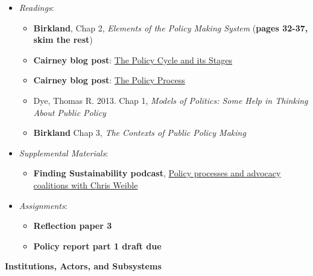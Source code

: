 \begin{itemize}

\item
  \emph{Readings}:

  \begin{itemize}
  
  \item
    \textbf{Birkland}, Chap 2, \emph{Elements of the Policy Making
    System} (\textbf{pages 32-37, skim the rest})
  \item
    \textbf{Cairney blog post}:
    \href{https://paulcairney.wordpress.com/2013/11/11/policy-concepts-in-1000-words-the-policy-cycle-and-its-stages/}{The
    Policy Cycle and its Stages}
  \item
    \textbf{Cairney blog post}:
    \href{https://paulcairney.wordpress.com/2017/07/11/policy-concepts-in-1000-words-the-policy-process/}{The
    Policy Process}
  \item
    Dye, Thomas R. 2013. Chap 1, \emph{Models of Politics: Some Help in
    Thinking About Public Policy}
  \item
    \textbf{Birkland} Chap 3, \emph{The Contexts of Public Policy
    Making}
  \end{itemize}
\item
  \emph{Supplemental Materials}:

  \begin{itemize}
  
  \item
    \textbf{Finding Sustainability podcast},
    \href{https://findsustpod.podbean.com/e/044-policy-processes-and-advocacy-coalitions-with-chris-weible/}{Policy
    processes and advocacy coalitions with Chris Weible}
  \end{itemize}
\item
  \emph{Assignments}:

  \begin{itemize}
  
  \item
    \textbf{Reflection paper 3}
  \item
    \textbf{Policy report part 1 draft due}
  \end{itemize}
\end{itemize}

\week \textbf{Institutions, Actors, and Subsystems}

